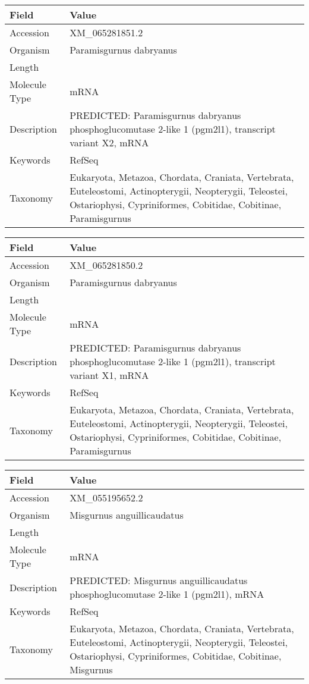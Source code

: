 \documentclass[10pt]{article}
\begin{document}
\vspace{1em}
{\footnotesize
\begin{longtable}{>{\raggedright\arraybackslash}p{4.5cm} >{\raggedright\arraybackslash}p{11.5cm}}
\textbf{Field} & \textbf{Value} \\
\hline
Accession & XM\_065281851.2 \\
Organism & Paramisgurnus dabryanus \\
Length & 3599 \\
Molecule Type & mRNA \\
Description & PREDICTED: Paramisgurnus dabryanus phosphoglucomutase 2-like 1 (pgm2l1), transcript variant X2, mRNA \\
Keywords & RefSeq \\
Taxonomy & Eukaryota, Metazoa, Chordata, Craniata, Vertebrata, Euteleostomi, Actinopterygii, Neopterygii, Teleostei, Ostariophysi, Cypriniformes, Cobitidae, Cobitinae, Paramisgurnus \\
\end{longtable}
}

\vspace{1em}
{\footnotesize
\begin{longtable}{>{\raggedright\arraybackslash}p{4.5cm} >{\raggedright\arraybackslash}p{11.5cm}}
\textbf{Field} & \textbf{Value} \\
\hline
Accession & XM\_065281850.2 \\
Organism & Paramisgurnus dabryanus \\
Length & 3754 \\
Molecule Type & mRNA \\
Description & PREDICTED: Paramisgurnus dabryanus phosphoglucomutase 2-like 1 (pgm2l1), transcript variant X1, mRNA \\
Keywords & RefSeq \\
Taxonomy & Eukaryota, Metazoa, Chordata, Craniata, Vertebrata, Euteleostomi, Actinopterygii, Neopterygii, Teleostei, Ostariophysi, Cypriniformes, Cobitidae, Cobitinae, Paramisgurnus \\
\end{longtable}
}

\vspace{1em}
{\footnotesize
\begin{longtable}{>{\raggedright\arraybackslash}p{4.5cm} >{\raggedright\arraybackslash}p{11.5cm}}
\textbf{Field} & \textbf{Value} \\
\hline
Accession & XM\_055195652.2 \\
Organism & Misgurnus anguillicaudatus \\
Length & 2746 \\
Molecule Type & mRNA \\
Description & PREDICTED: Misgurnus anguillicaudatus phosphoglucomutase 2-like 1 (pgm2l1), mRNA \\
Keywords & RefSeq \\
Taxonomy & Eukaryota, Metazoa, Chordata, Craniata, Vertebrata, Euteleostomi, Actinopterygii, Neopterygii, Teleostei, Ostariophysi, Cypriniformes, Cobitidae, Cobitinae, Misgurnus \\
\end{longtable}
}
\end{document}
